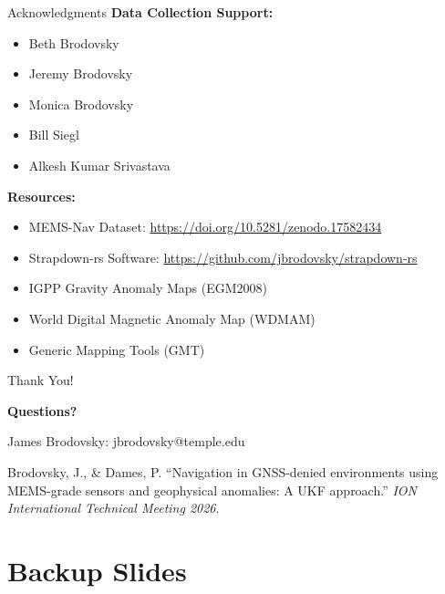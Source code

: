 \documentclass[aspectratio=169]{beamer}
\begin{document}
\begin{frame}{Acknowledgments}
\textbf{Data Collection Support:}
\begin{itemize}
    \item Beth Brodovsky
    \item Jeremy Brodovsky
    \item Monica Brodovsky
    \item Bill Siegl
    \item Alkesh Kumar Srivastava
\end{itemize}

\vspace{.25cm}

\textbf{Resources:}
\begin{itemize}
    \item MEMS-Nav Dataset: \url{https://doi.org/10.5281/zenodo.17582434}
    \item Strapdown-rs Software: \url{https://github.com/jbrodovsky/strapdown-rs}
    \item IGPP Gravity Anomaly Maps (EGM2008)
    \item World Digital Magnetic Anomaly Map (WDMAM)
    \item Generic Mapping Tools (GMT)
\end{itemize}
\end{frame}

\begin{frame}{Thank You!}

\vspace{0.5cm}
\centering
\Large
\textbf{Questions?}

\vspace{0.3cm}
\normalsize
James Brodovsky: jbrodovsky@temple.edu

\vspace{0.5cm}

Brodovsky, J., \& Dames, P. ``Navigation in GNSS-denied environments using MEMS-grade sensors and geophysical anomalies: A UKF approach.'' \textit{ION International Technical Meeting 2026}.
\end{frame}

\section{Backup Slides}
\appendix
\end{document}
